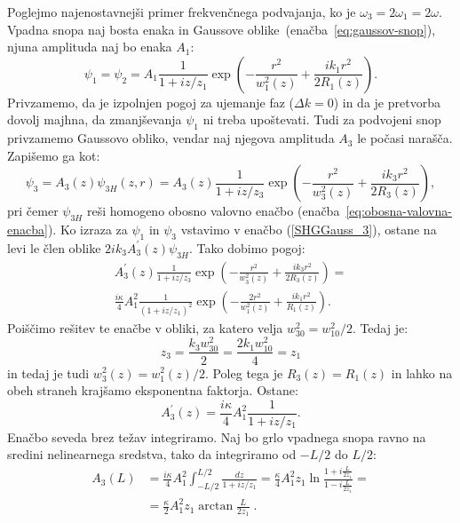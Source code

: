 Poglejmo najenostavnejši primer frekvenčnega podvajanja, ko je 
$\omega_{3}=2\omega_{1}=2\omega$.
Vpadna snopa naj bosta enaka in Gaussove oblike~(enačba~\ref{eq:gaussov-snop}), 
njuna amplituda  naj bo enaka $A_1$:
\begin{equation}
\psi_{1} = \psi_2 = A_{1}\frac{1}{1+iz/z_1}
\exp\left(-\frac{r^{2}}{w_1^{2}(z)}+\frac{ik_1r^{2}}{2R_1(z)}\right)\!\!.
\label{8.21}
\end{equation}
Privzamemo, da je izpolnjen pogoj za ujemanje faz 
($\Delta k=0$) in da je pretvorba dovolj majhna, da zmanjševanja $\psi_{1}$
ni treba upoštevati. Tudi za podvojeni snop privzamemo Gaussovo 
obliko, vendar naj njegova amplituda $A_3$ le počasi narašča. Zapišemo ga kot:
\begin{equation}
\psi_{3}=A_{3}(z)\psi_{3H}(z,r)=A_{3}(z)\frac{1}{1+iz/z_{3}}
\exp\left(-\frac{r^{2}}{w_{3}^{2}(z)}+\frac{ik_{3}r^{2}}{2R_{3}(z)}\right)\!\!,
\label{8.22}
\end{equation}
pri čemer $\psi_{3H}$ reši homogeno obosno valovno 
enačbo (enačba~\ref{eq:obosna-valovna-enacba}). Ko izraza za $\psi_{1}$
in $\psi_{3}$ vstavimo v enačbo (\ref{SHGGauss_3}),
ostane na levi le člen oblike $2ik_{3}A_{3}^{\prime}(z)\psi_{3H}$. Tako dobimo pogoj:
\begin{multline}
A_{3}^{\prime}(z)\frac{1}{1+iz/z_3}\exp\left(-\frac{r^{2}}{w_{3}^{2}(z)}+\frac{ik_{3}r^{2}}
{2R_{3}(z)}\right)=\\
\frac{i\kappa}{4}A_{1}^{2}\frac{1}{(1+iz/z_{1})^{2}}\exp\left(-\frac{2r^{2}}
{w_{1}^{2}(z)}+\frac{ik_{1}r^{2}}{R_{1}(z)}\right)\!\!.
\label{8.23}
\end{multline}
Poiščimo rešitev te enačbe v obliki, za katero velja $w_{30}^{2}=w_{10}^{2}/2$. Tedaj je:
\begin{equation}
z_{3}=\frac{k_{3}w_{30}^{2}}{2}=\frac{2k_{1}w_{10}^{2}}{4}=z_{1}
\end{equation}
in tedaj je tudi $w_{3}^{2}(z)=w_{1}^{2}(z)/2$. Poleg tega je $R_{3}(z)=R_{1}(z)$
in lahko na obeh straneh krajšamo eksponentna faktorja. Ostane: 
\begin{equation}
A_{3}^{\prime}(z)=\frac{i\kappa}{4}A_{1}^{2}\frac{1}{1+iz/z_1}.
\label{8.24}
\end{equation}
Enačbo seveda brez težav integriramo. Naj bo grlo vpadnega
snopa ravno na sredini nelinearnega sredstva, tako da integriramo
od $-L/2$ do $L/2$:
\begin{align}
A_{3}(L) & =  \frac{i\kappa}{4}A_{1}^{2}\int_{-L/2}^{L/2}\frac{dz}{1+iz/z_1} 
  = \frac{\kappa}{4}A_{1}^{2}z_{1}\ln\frac{1+i\frac{L}{2z_{1}}}{1-i\frac{L}{2z_{1}}}= \nonumber \\
 & =  \frac{\kappa}{2}A_{1}^{2}z_{1}\arctan\frac{L}{2z_{1}}\;.
\end{align}
